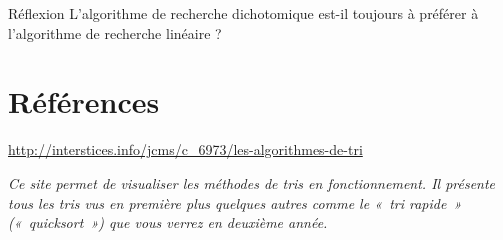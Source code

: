		\begin{Exercice}{Réflexion}
				L’algorithme de recherche dichotomique est-il toujours à préférer à
				l’algorithme de recherche linéaire ?
		\end{Exercice}


\section{Références}

	\liststyleListv
	\begin{liste}
		\item {
			\url{http://interstices.info/jcms/c_6973/les-algorithmes-de-tri}

			\textit{Ce site permet de visualiser les méthodes de tris en
			fonctionnement. Il présente tous les tris vus en première plus quelques
			autres comme le «~tri rapide~» («~quicksort~») que vous verrez en
			deuxième année. }}
	\end{liste}
